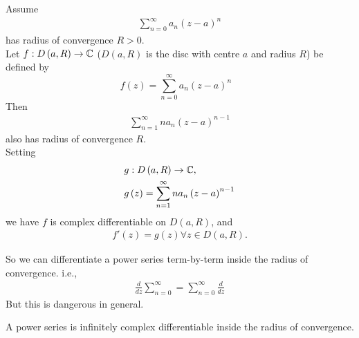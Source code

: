 \documentclass[a4paper]{article}
\begin{document}
\begin{thm}
Assume
\begin{equation*}
\begin{aligned}
\sum_{n=0}^\infty a_n \left(z-a\right)^n
\end{aligned}
\end{equation*}
has radius of convergence $R>0$.\\
Let $f: D\left(a,R\right) \to \mathbb{C}$ ($D\left(a,R\right)$ is the disc with centre $a$ and radius $R$) be defined by
\begin{equation*}
f\left(z\right) = \sum_{n=0}^\infty a_n \left(z-a\right)^n
\begin{aligned}
\end{aligned}
\end{equation*}
Then
\begin{equation*}
\begin{aligned}
\sum_{n=1}^\infty n a_n \left(z-a\right)^{n-1}
\end{aligned}
\end{equation*}
also has radius of convergence $R$.\\
Setting
\begin{equation*}
\begin{aligned}
&g:D\left(a,R\right) \to \mathbb{C},\\
&g\left(z\right) = \sum_{n=1}^\infty n a_n \left(z-a\right)^{n-1}
\end{aligned}
\end{equation*}
we have $f$ is complex differentiable on $D\left(a,R\right)$, and
\begin{equation*}
\begin{aligned}
f'\left(z\right) = g\left(z\right) \forall z\in D\left(a,R\right).
\end{aligned}
\end{equation*}
\begin{rem}
So we can differentiate a power series term-by-term inside the radius of convergence. i.e.,
\begin{equation*}
\begin{aligned}
\frac{d}{dz}\sum_{n=0}^\infty = \sum_{n=0}^\infty \frac{d}{dz}
\end{aligned}
\end{equation*}
But this is dangerous in general.
\end{rem}
\end{thm}

\begin{coro}
A power series is infinitely complex differentiable inside the radius of convergence.
\end{coro}
\end{document}
